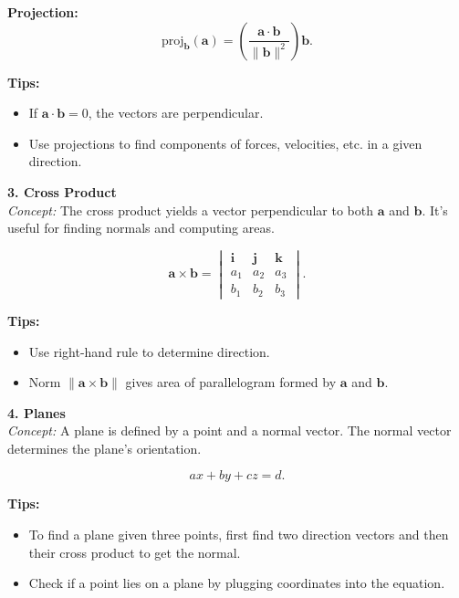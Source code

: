\documentclass[9pt]{article}
\begin{document}
\begin{multicols}{2}
\begin{tcolorbox}[title=, colframe=brightgreen]
\textbf{Projection:}
\[
\text{proj}_{\mathbf{b}}(\mathbf{a})=\left(\frac{\mathbf{a}\cdot\mathbf{b}}{\|\mathbf{b}\|^2}\right)\mathbf{b}.
\]

\textbf{Tips:}
\begin{itemize}
    \item If $\mathbf{a}\cdot\mathbf{b}=0$, the vectors are perpendicular.
    \item Use projections to find components of forces, velocities, etc. in a given direction.
\end{itemize}
\end{tcolorbox}

\begin{tcolorbox}[title=, colframe=brightpink]
\textbf{3. Cross Product}\\
\textit{Concept:} The cross product yields a vector perpendicular to both $\mathbf{a}$ and $\mathbf{b}$. It’s useful for finding normals and computing areas.

\[
\mathbf{a}\times \mathbf{b} = \begin{vmatrix}
\mathbf{i} & \mathbf{j} & \mathbf{k}\\
a_1 & a_2 & a_3 \\
b_1 & b_2 & b_3
\end{vmatrix}.
\]

\textbf{Tips:}
\begin{itemize}
    \item Use right-hand rule to determine direction.
    \item Norm $\|\mathbf{a}\times \mathbf{b}\|$ gives area of parallelogram formed by $\mathbf{a}$ and $\mathbf{b}$.
\end{itemize}
\end{tcolorbox}

\begin{tcolorbox}[title=, colframe=brightyellow]
\textbf{4. Planes}\\
\textit{Concept:} A plane is defined by a point and a normal vector. The normal vector determines the plane’s orientation.

\[
ax+by+cz=d.
\]

\textbf{Tips:}
\begin{itemize}
    \item To find a plane given three points, first find two direction vectors and then their cross product to get the normal.
    \item Check if a point lies on a plane by plugging coordinates into the equation.
\end{itemize}
\end{tcolorbox}


\end{multicols}
\end{document}
